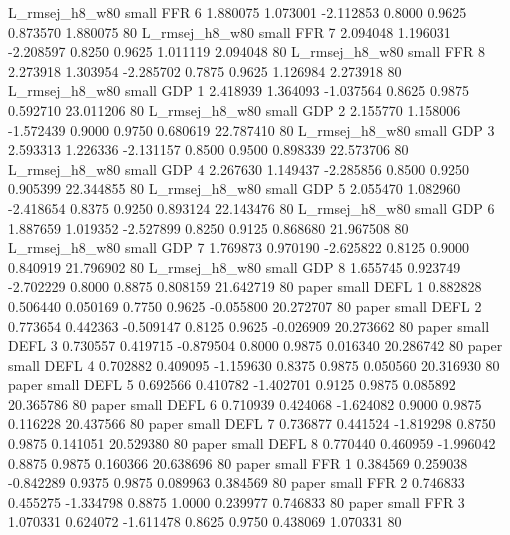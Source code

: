 L_rmsej_h8_w80      small      FFR                 6 1.880075 1.073001 -2.112853 0.8000 0.9625  0.873570    1.880075 80
L_rmsej_h8_w80      small      FFR                 7 2.094048 1.196031 -2.208597 0.8250 0.9625  1.011119    2.094048 80
L_rmsej_h8_w80      small      FFR                 8 2.273918 1.303954 -2.285702 0.7875 0.9625  1.126984    2.273918 80
L_rmsej_h8_w80      small      GDP                 1 2.418939 1.364093 -1.037564 0.8625 0.9875  0.592710   23.011206 80
L_rmsej_h8_w80      small      GDP                 2 2.155770 1.158006 -1.572439 0.9000 0.9750  0.680619   22.787410 80
L_rmsej_h8_w80      small      GDP                 3 2.593313 1.226336 -2.131157 0.8500 0.9500  0.898339   22.573706 80
L_rmsej_h8_w80      small      GDP                 4 2.267630 1.149437 -2.285856 0.8500 0.9250  0.905399   22.344855 80
L_rmsej_h8_w80      small      GDP                 5 2.055470 1.082960 -2.418654 0.8375 0.9250  0.893124   22.143476 80
L_rmsej_h8_w80      small      GDP                 6 1.887659 1.019352 -2.527899 0.8250 0.9125  0.868680   21.967508 80
L_rmsej_h8_w80      small      GDP                 7 1.769873 0.970190 -2.625822 0.8125 0.9000  0.840919   21.796902 80
L_rmsej_h8_w80      small      GDP                 8 1.655745 0.923749 -2.702229 0.8000 0.8875  0.808159   21.642719 80
         paper      small     DEFL                 1 0.882828 0.506440  0.050169 0.7750 0.9625 -0.055800   20.272707 80
         paper      small     DEFL                 2 0.773654 0.442363 -0.509147 0.8125 0.9625 -0.026909   20.273662 80
         paper      small     DEFL                 3 0.730557 0.419715 -0.879504 0.8000 0.9875  0.016340   20.286742 80
         paper      small     DEFL                 4 0.702882 0.409095 -1.159630 0.8375 0.9875  0.050560   20.316930 80
         paper      small     DEFL                 5 0.692566 0.410782 -1.402701 0.9125 0.9875  0.085892   20.365786 80
         paper      small     DEFL                 6 0.710939 0.424068 -1.624082 0.9000 0.9875  0.116228   20.437566 80
         paper      small     DEFL                 7 0.736877 0.441524 -1.819298 0.8750 0.9875  0.141051   20.529380 80
         paper      small     DEFL                 8 0.770440 0.460959 -1.996042 0.8875 0.9875  0.160366   20.638696 80
         paper      small      FFR                 1 0.384569 0.259038 -0.842289 0.9375 0.9875  0.089963    0.384569 80
         paper      small      FFR                 2 0.746833 0.455275 -1.334798 0.8875 1.0000  0.239977    0.746833 80
         paper      small      FFR                 3 1.070331 0.624072 -1.611478 0.8625 0.9750  0.438069    1.070331 80

